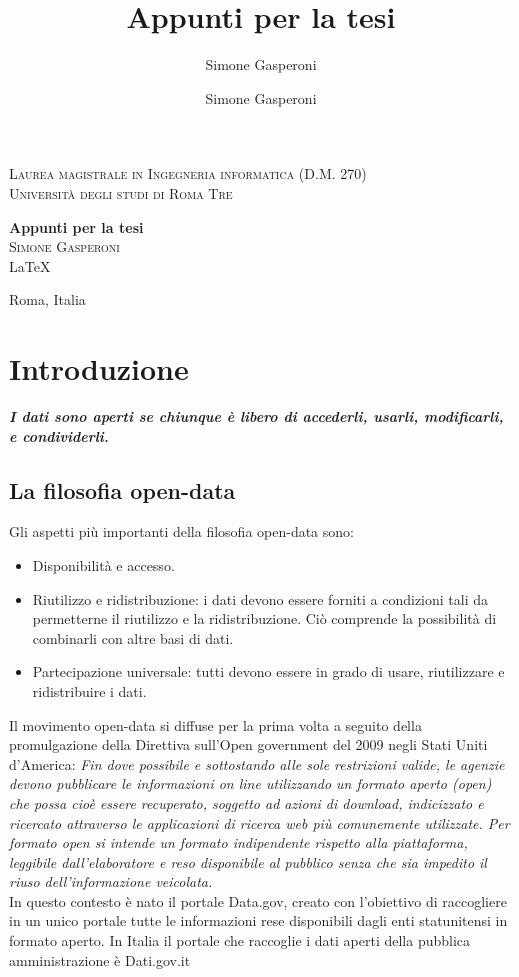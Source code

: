 \documentclass{article}
\author{Simone Gasperoni}
\author{Simone Gasperoni}
\title{Appunti per la tesi}
\theoremstyle{plain}
\theoremstyle{definition}
\begin{document}
\begin{titlepage}
\begin{center}

\textsc{Laurea magistrale in Ingegneria informatica (D.M. 270)}\\[0.5cm]
\textsc{Università degli studi di Roma Tre}\\[0.5cm]

\hrulefill

{ \huge \bfseries Appunti per la tesi \\[0.4cm] }
\textsc{\Large Simone Gasperoni}\\[0.5cm]
\vfill
\LaTeX


Roma, Italia
\end{center}
\end{titlepage}


\tableofcontents

\newpage
\section{Introduzione}
\textbf{\textit{I dati sono aperti se chiunque è libero di accederli, usarli, modificarli, e condividerli.}}
\footnotemark
{}

\subsection{La filosofia open-data}

Gli aspetti più importanti della filosofia open-data sono:
\begin{itemize}
\item Disponibilità e accesso.
\item Riutilizzo e ridistribuzione: i dati devono essere forniti a condizioni tali da permetterne il riutilizzo e la ridistribuzione. Ciò comprende la possibilità di combinarli con altre basi di dati.
\item Partecipazione universale: tutti devono essere in grado di usare, riutilizzare e ridistribuire i dati.
\end{itemize}

Il movimento open-data si diffuse per la prima volta a seguito della promulgazione della Direttiva sull'Open government del 2009 negli Stati Uniti d'America:
\textit{Fin dove possibile e sottostando alle sole restrizioni valide, le agenzie devono pubblicare le informazioni on line utilizzando un formato aperto (open) che possa cioè essere recuperato, soggetto ad azioni di download, indicizzato e ricercato attraverso le applicazioni di ricerca web più comunemente utilizzate. Per formato open si intende un formato indipendente rispetto alla piattaforma, leggibile dall'elaboratore e reso disponibile al pubblico senza che sia impedito il riuso dell'informazione veicolata.}
\\
In questo contesto è nato il portale Data.gov, creato con l'obiettivo di raccogliere in un unico portale tutte le informazioni rese disponibili dagli enti statunitensi in formato aperto. In Italia il portale che raccoglie i dati aperti della pubblica amministrazione è Dati.gov.it
 
\end{document}
